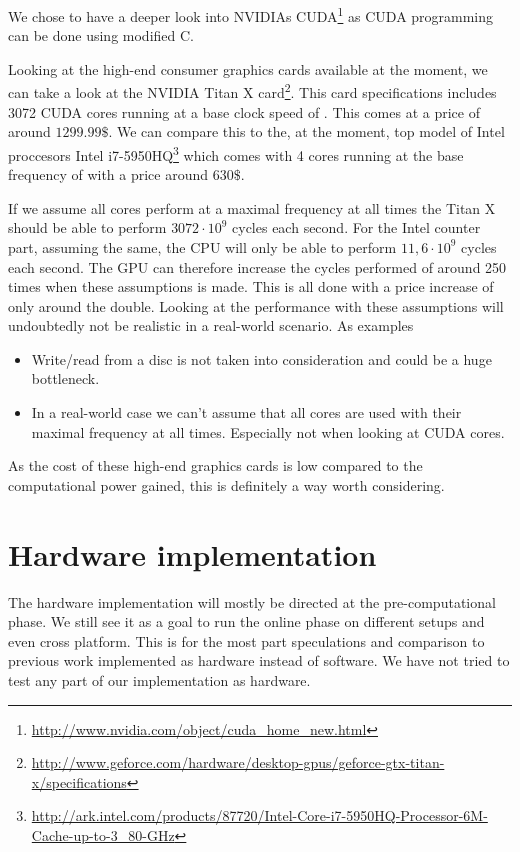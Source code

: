 We chose to have a deeper look into NVIDIAs
CUDA\footnote{\url{http://www.nvidia.com/object/cuda_home_new.html}}
as CUDA programming can be done using modified C. 

Looking at the high-end consumer graphics cards available at the
moment, we can take a look at the NVIDIA Titan X
card\footnote{\url{http://www.geforce.com/hardware/desktop-gpus/geforce-gtx-titan-x/specifications}}. This
card specifications includes 3072 CUDA cores running at a base clock
speed of . This comes at a price of around
$1299.99\$$. We can compare this to the, at the moment, top model of Intel
proccesors Intel
i7-5950HQ\footnote{\url{http://ark.intel.com/products/87720/Intel-Core-i7-5950HQ-Processor-6M-Cache-up-to-3_80-GHz}}
which comes with 4 cores running at the base frequency of
 with a price around $630\$$.

If we assume all cores perform at a maximal frequency at all times the
Titan X should be able to perform $3072 \cdot 10^9$ cycles each
second. For the Intel counter part, assuming the same, the CPU will
only be able to perform $11,6 \cdot 10^9$ cycles each second. The GPU
can therefore increase the cycles performed of around 250 times when
these assumptions is made. This is all done with a price increase of
only around the double. Looking at the performance with these
assumptions will undoubtedly not be realistic in a real-world
scenario. As examples
\begin{itemize}
\item Write/read from a disc is not taken into
consideration and could be a huge bottleneck. 
\item In a real-world case we can't assume that all cores are used
  with their maximal frequency at all times. Especially not when
  looking at CUDA cores.
\end{itemize}
As the cost of these high-end graphics cards is low compared to
the computational power gained, this is definitely a way worth considering.

\section{Hardware implementation}

The hardware implementation will mostly be directed at the
pre-computational phase. We still see it as a goal to run the online
phase on different setups and even cross platform. This is for the
most part speculations and comparison to previous work implemented as
hardware instead of software. We have not tried to test any part of
our implementation as hardware.

